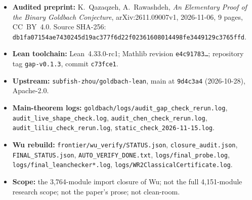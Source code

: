 \documentclass[11pt,a4paper]{article}
\theoremstyle{plain}
\theoremstyle{definition}
\begin{document}
\begin{itemize}
\item \textbf{Audited preprint:} K.~Qazaqzeh, A.~Rawashdeh, \emph{An Elementary Proof of the Binary Goldbach Conjecture}, arXiv:2611.09007v1, 2026-11-06, 9 pages, CC~BY~4.0. Source SHA-256: \texttt{db1fa07154ae7430245d19ac377f6d22f02361608014498fe3449129c3765ffd}.

\item \textbf{Lean toolchain:} Lean~4.33.0-rc1; Mathlib revision \texttt{e4c91783\ldots}; repository tag \texttt{gap-v0.1.3}, commit \texttt{c73fce1}.
\item \textbf{Upstream:} \texttt{subfish-zhou/goldbach-lean}, main at \texttt{9d4c3a4} (2026-10-28), Apache-2.0.
\item \raggedright \textbf{Main-theorem logs:} \texttt{goldbach/logs/audit\_gap\_check\_rerun.log}, \texttt{audit\_live\_shape\_check.log}, \texttt{audit\_chen\_check\_rerun.log}, \texttt{audit\_liliu\_check\_rerun.log}, \texttt{static\_check\_2026-11-15.log}.
\item \textbf{Wu rebuild:} \texttt{frontier/wu\_verify/STATUS.json}, \texttt{closure\_audit.json}, \texttt{FINAL\_STATUS.json}, \texttt{AUTO\_VERIFY\_DONE.txt}, \texttt{logs/final\_probe.log}, \texttt{logs/final\_leanchecker*.log}, \texttt{logs/WR2ClassicalCertificate.log}.
\item \textbf{Scope:} the 3,764-module import closure of Wu; not the full 4,151-module research scope; not the paper's prose; not clean-room.
\end{itemize}
\end{document}
